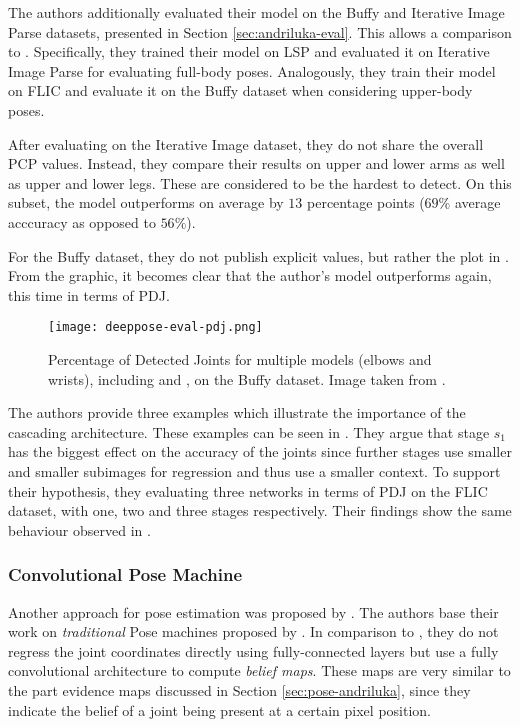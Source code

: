 The authors additionally evaluated their model on the Buffy and Iterative Image Parse datasets, presented in Section \ref{sec:andriluka-eval}.
This allows a comparison to \cite{yang_articulated_2013}.
Specifically, they trained their model on LSP and evaluated it on Iterative Image Parse for evaluating full-body poses.
Analogously, they train their model on FLIC and evaluate it on the Buffy dataset when considering upper-body poses.

After evaluating on the Iterative Image dataset, they do not share the overall PCP values.
Instead, they compare their results on upper and lower arms as well as upper and lower legs.
These are considered to be the hardest to detect.
On this subset, the model outperforms \cite{yang_articulated_2013} on average by $13$ percentage points ($69\%$ average acccuracy as opposed to $56\%$).

For the Buffy dataset, they do not publish explicit values, but rather the plot in .
From the graphic, it becomes clear that the author's model outperforms \cite{yang_articulated_2013} again, this time in terms of PDJ. 

\begin{figure}[htb!]
    \centering
    \texttt{[image: deeppose-eval-pdj.png]}
    \caption{Percentage of Detected Joints for multiple models (elbows and wrists), including \cite{toshev_deeppose:_2014} and \cite{yang_articulated_2013}, on the Buffy dataset. Image taken from \cite{toshev_deeppose:_2014}.}
    \label{fig:deeppose-eval}
\end{figure}

The authors provide three examples which illustrate the importance of the cascading architecture.
These examples can be seen in .
They argue that stage $s_1$ has the biggest effect on the accuracy of the joints since further stages use smaller and smaller subimages for regression and thus use a smaller context.
To support their hypothesis, they evaluating three networks in terms of PDJ on the FLIC dataset, with one, two and three stages respectively.
Their findings show the same behaviour observed in .

\subsubsection{Convolutional Pose Machine}
\label{sec:convolutional-pose-machine}
Another approach for pose estimation was proposed by \cite{wei_convolutional_2016}.
The authors base their work on \textit{traditional} Pose machines proposed by \cite{ramakrishna_pose_2014}.
In comparison to \cite{toshev_deeppose:_2014}, they do not regress the joint coordinates directly using fully-connected layers but use a fully convolutional architecture to compute \textit{belief maps}.
These maps are very similar to the part evidence maps discussed in Section \ref{sec:pose-andriluka}, since they indicate the belief of a joint being present at a certain pixel position.

